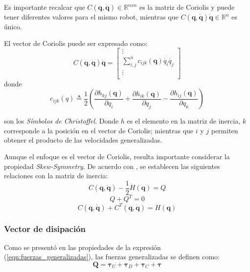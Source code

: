     Es importante recalcar que $C(\boldsymbol{q}, \boldsymbol{\dot{q}}) \in \mathbb{R}^{nxn}$ es la matriz de Coriolis y puede tener diferentes valores para el mismo robot, 
    mientras que $C(\boldsymbol{q}, \boldsymbol{\dot{q}}) \boldsymbol{\dot{q}} \in \mathbb{R}^n$ es único.

    El vector de Coriolis puede ser expresado como:
    \begin{equation}
        \label{eqn:coriolis_vector}
        C(\boldsymbol{q}, \boldsymbol{\dot{q}}) \boldsymbol{\dot{q}} = \begin{bmatrix} \vdots\\
        \sum_{i,j}^{n} c_{ijk}(\boldsymbol{q})\dot{q_{i}}\dot{q_{j}}   \\  \vdots\\ \end{bmatrix}
    \end{equation}
    donde 
    \begin{equation}
        \label{eqn:christoffel}
        c_{ijk}(q) \triangleq \frac{1}{2}\left( \frac{\partial h_{kj}(\boldsymbol{q})}{\partial q_{i}}+\frac{\partial h_{ik}(\boldsymbol{q})}{\partial q_{j}}
        -\frac{\partial h_{ij}(\boldsymbol{q})}{\partial q_{k}} \right)
    \end{equation}

    son los \emph{Símbolos de Christoffel}. Donde $h$ es el elemento en la matriz de inercia, $k$ corresponde a la posición en el vector de Coriolis; 
    mientras que $i$ y $j$ permiten obtener el producto de las velocidades generalizadas. 

    Aunque el enfoque es el vector de Coriolis, resulta importante considerar la propiedad \emph{Skew-Symmetry}. De acuerdo con \cite{rigid_multibody},
    se establecen las siguientes relaciones con la matriz de inercia:
    \begin{equation}
        \label{eqn:skew1}
        C(\boldsymbol{q}, \boldsymbol{\dot{q}}) - \frac{1}{2}\dot{H}(\boldsymbol{q}) = Q 
    \end{equation}
    \begin{equation}
        \label{eqn:skew2}
        Q + Q^T = 0
    \end{equation}
    \begin{equation}
        \label{eqn:skew3}
        C(\boldsymbol{q}, \boldsymbol{\dot{q}}) + C^T(\boldsymbol{q}, \boldsymbol{\dot{q}}) = \dot{H}(\boldsymbol{q})
    \end{equation}

    \subsubsection{Vector de disipación}
    \noindent Como se presentó en las propiedades de la expresión (\ref{eqn:fuerzas_generalizadas}), las fuerzas generalizadas se definen como:
    \begin{equation}
        \label{eqn:torques_generalizados}
         \boldsymbol{Q} = \boldsymbol{\tau}_U + \boldsymbol{\tau}_D + \boldsymbol{\tau}_C + \boldsymbol{\tau}
    \end{equation}

